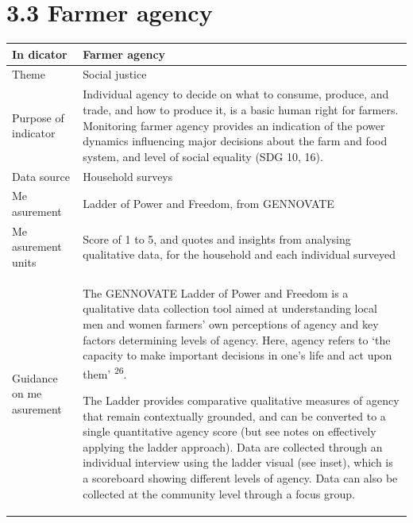 \documentclass[
  letterpaper,
  DIV=11,
  numbers=noendperiod]{scrreprt}
\begin{document}
\chapter{3.3 Farmer agency}\label{farmer-agency}

\begin{longtable}[]{@{}
  >{\raggedright\arraybackslash}p{}
  >{\raggedright\arraybackslash}p{}@{}}
\toprule\noalign{}
\begin{minipage}[b]{\linewidth}\raggedright
\textbf{In dicator}
\end{minipage} & \begin{minipage}[b]{\linewidth}\raggedright
\textbf{Farmer agency}
\end{minipage} \\
\midrule\noalign{}
\endhead
\bottomrule\noalign{}
\endlastfoot
Theme & Social justice \\
Purpose of indicator & Individual agency to decide on what to consume,
produce, and trade, and how to produce it, is a basic human right for
farmers. Monitoring farmer agency provides an indication of the power
dynamics influencing major decisions about the farm and food system, and
level of social equality (SDG 10, 16). \\
Data source & Household surveys \\
Me asurement & Ladder of Power and Freedom, from GENNOVATE \\
Me asurement units & Score of 1 to 5, and quotes and insights from
analysing qualitative data, for the household and each individual
surveyed \\
Guidance on me asurement & \begin{minipage}[t]{\linewidth}\raggedright
The GENNOVATE Ladder of Power and Freedom is a qualitative data
collection tool aimed at understanding local men and women farmers' own
perceptions of agency and key factors determining levels of agency.
Here, agency refers to `the capacity to make important decisions in
one's life and act upon them' \textsuperscript{26}.

The Ladder provides comparative qualitative measures of agency that
remain contextually grounded, and can be converted to a single
quantitative agency score (but see notes on effectively applying the
ladder approach). Data are collected through an individual interview
using the ladder visual (see inset), which is a scoreboard showing
different levels of agency. Data can also be collected at the community
level through a focus group.


\end{minipage}
\end{longtable}
\end{document}
